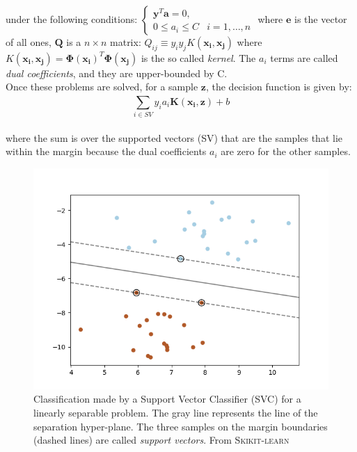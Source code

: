 \documentclass{standalone}
\begin{document}
under the following conditions: $\begin{cases}
    \mathbf{y}^T \mathbf{a} = 0, &  \\
    0 \leq a_i \leq C  &  i = 1, \dots, n
    \end{cases}$
\newline
where $\mathbf{e}$ is the vector of all ones, $\mathbf{Q}$ is a $n \times n$ matrix: $Q_{ij}\equiv y_i y_j K(\mathbf{x_i}, \mathbf{x_j})$ where $K(\mathbf{x_i}, \mathbf{x_j}) = \mathbf{\Phi(x_i)}^T \mathbf{\Phi(x_j)} $ is the so called \textit{kernel}.
The $a_i$ terms are called \textit{dual coefficients}, and they are upper-bounded by C.\\
Once these problems are solved, for a sample $\mathbf{z}$, the decision function is given by: 
\begin{equation}
    \sum_{i \in SV}^{}  y_i a_i \mathbf{K(x_i, z)} + b
\end{equation}
\\
where the sum is over the supported  vectors (SV) that are the samples that lie within the margin because the dual coefficients $a_i$ are zero for the other samples\cite{SVCscikit}.

\begin{figure}[ht]

    \centering
    \includegraphics[width=.95\textwidth]{../images/svcexample.png}
    
    \caption{Classification made by a Support Vector Classifier (SVC) for a linearly separable problem. The gray line represents the line of the separation hyper-plane. The three samples on the margin boundaries (dashed lines) are called \textit{support vectors}. From \textsc{Skikit-learn}\cite{SVCscikit}}\label{fig:svc}
    
    
    \end{figure}
\end{document}
